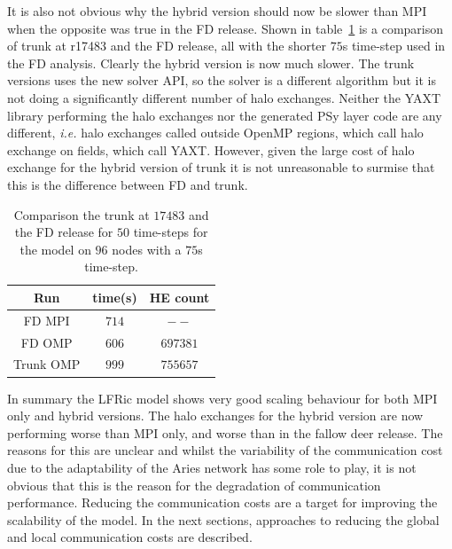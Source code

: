 It is also not obvious why the hybrid version should now be slower
than MPI when the opposite was true in the FD release. Shown in
table~\ref{fig:fd_comp} is a comparison of trunk at r17483 and the FD
release, all with the shorter $75$s time-step used in the FD
analysis. Clearly the hybrid version is now much slower. The trunk
versions uses the new solver API, so the solver is a different
algorithm but it is not doing a significantly different number of halo
exchanges. Neither the YAXT library performing the halo exchanges nor
the generated PSy layer code are any different, {\em i.e.} halo
exchanges called outside OpenMP regions, which call halo exchange on
fields, which call YAXT. However, given the large cost of halo
exchange for the hybrid version of trunk it is not unreasonable to
surmise that this is the difference between FD and trunk.

\begin{table}
\centering
\caption{\label{fig:fd_comp}Comparison the trunk at $17483$ and the FD
  release for $50$ time-steps for the model on $96$ nodes
  with a $75$s time-step.}
\begin{tabular}{ccc}
Run & time(s) & HE count \\\hline
FD MPI & $714$ & $--$ \\
FD OMP & $606$ & $697381$ \\
Trunk OMP & $999$ & $755657$  
\end{tabular}
\end{table}

In summary the LFRic model shows very good scaling behaviour for both
MPI only and hybrid versions. The halo exchanges for the hybrid
version are now performing worse than MPI only, and worse than in the
fallow deer release. The reasons for this are unclear and whilst the
variability of the communication cost due to the adaptability of the
Aries network has some role to play, it is not obvious that this is
the reason for the degradation of communication performance. Reducing
the communication costs are a target for improving the scalability of
the model. In the next sections, approaches to reducing the global
and local communication costs are described.